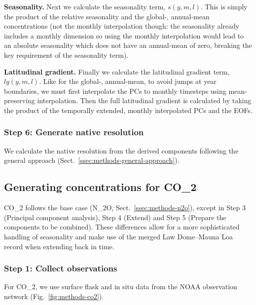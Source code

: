 \textbf{Seasonality.}
Next we calculate the seasonality term, $s(y, m, l)$.
This is simply the product of the relative seasonality and the global-, annual-mean concentrations
(not the monthly interpolation though:
the seasonality already includes a monthly dimension
so using the monthly interpolation would lead to an absolute seasonality
which does not have an annual-mean of zero,
breaking the key requirement of the seasonality term).

\textbf{Latitudinal gradient.}
Finally we calculate the latitudinal gradient term, $lg(y, m, l)$.
Like for the global-, annual-mean,
to avoid jumps at year boundaries, we must first interpolate the PCs to monthly timesteps
using mean-preserving interpolation.
Then the full latitudinal gradient is calculated
by taking the product of the temporally extended, monthly interpolated PCs and the EOFs.

\subsubsection{Step 6: Generate native resolution}
\label{sssec:methods-n2o-generate-native-resolution}

We calculate the native resolution from the derived components following the general approach (Sect.~\ref{ssec:methods-general-approach}).

\subsection{Generating concentrations for CO_2}
\label{ssec:methods-co2}

CO_2 follows the base case (N_2O, Sect.~\ref{ssec:methods-n2o}),
except in Step 3 (Principal component analysis), Step 4 (Extend) and Step 5 (Prepare the components to be combined).
These differences allow for a more sophisticated handling of seasonality
and make use of the merged Law Dome--Mauna Loa record when extending back in time.

\subsubsection{Step 1: Collect observations}
\label{sssec:methods-co2-collect-observations}

For CO_2, we use surface flask \citep{lan_co2-flask_2024} and in situ \citep{thoning_co2-in-situ_2024} data from the NOAA observation network
(Fig.~\ref{fig:methods-co2}).

